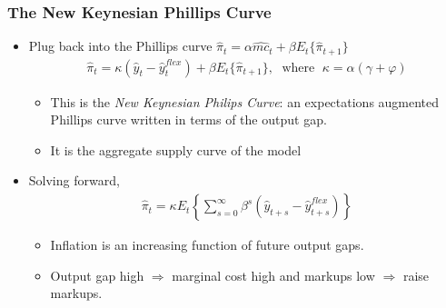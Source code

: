 \documentclass[11pt,aspectratio=169,xcolor={dvipsnames},hyperref={pdftex,pdfpagemode=UseNone,hidelinks,pdfdisplaydoctitle=true},usepdftitle=false]{beamer}
\begin{document}
%


\begin{frame}
\frametitle{The New Keynesian Phillips Curve
}
\begin{itemize}
	\item Plug back into the Phillips curve $\hat{\pi}_t=\alpha\hat{mc}_{t}+\beta E_t\{\hat{\pi}_{t+1}\}$
	\begin{align*}
		\hat{\pi}_t=\kappa(\hat{y}_t-\hat{y}_t^{flex})+\beta E_t\{\hat{\pi}_{t+1}\},\;\text{ where }\;\kappa=\alpha(\gamma+\varphi)
\end{align*}
	\begin{itemize}
		\item This is the \emph{New Keynesian Philips Curve}: an expectations augmented Phillips curve written in terms of the output gap.
		\item It is the aggregate supply curve of the model
	\end{itemize}
	\item Solving forward,
	\begin{align*}
		\hat{\pi}_t=\kappa E_t\left\{\sum_{s=0}^{\infty}\beta^s(\hat{y}_{t+s}-\hat{y}_{t+s}^{flex})\right\}
	\end{align*}
	\begin{itemize}
		\item Inflation is an increasing function of future output gaps.
		\item Output gap high $\Rightarrow$ marginal cost high and markups low $\Rightarrow$ raise markups.
	\end{itemize}
\end{itemize}
\end{frame}
\end{document}
